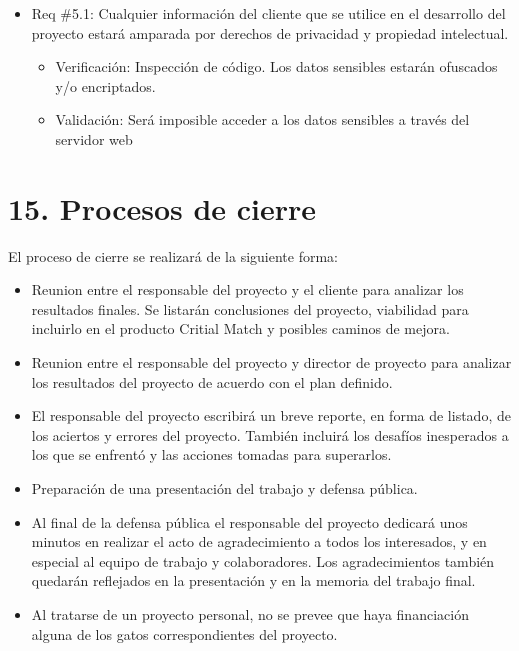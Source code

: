 \documentclass[
11pt, %
]{Clases/charter}
\begin{document}
\begin{itemize}
	\item Req \#5.1: Cualquier información del cliente que se utilice en el desarrollo del proyecto estará amparada por derechos de privacidad y propiedad intelectual.
	      \begin{itemize}
		      \item Verificación: Inspección de código. Los datos sensibles estarán ofuscados y/o encriptados.
		      \item Validación: Será imposible acceder a los datos sensibles a través del servidor web
	      \end{itemize}

\end{itemize}

\pagebreak

\section{15. Procesos de cierre}
\label{sec:cierre}
El proceso de cierre se realizará de la siguiente forma:

\begin{itemize}
	\item Reunion entre el responsable del proyecto y el cliente para analizar los resultados finales.
	      Se listarán conclusiones del proyecto, viabilidad para incluirlo en el producto Critial Match y posibles caminos de mejora.
	\item Reunion entre el responsable del proyecto y director de proyecto para analizar los resultados del proyecto de acuerdo con el plan definido.
	\item El responsable del proyecto escribirá un breve reporte, en forma de listado, de los aciertos y errores del proyecto.
	      También incluirá los desafíos inesperados a los que se enfrentó y las acciones tomadas para superarlos.
	\item Preparación de una presentación del trabajo y defensa pública.
	\item Al final de la defensa pública el responsable del proyecto dedicará unos minutos en realizar el acto de agradecimiento a todos los interesados, y en especial al equipo de trabajo y colaboradores.
	      Los agradecimientos también quedarán reflejados en la presentación y en la memoria del trabajo final.
	\item Al tratarse de un proyecto personal, no se prevee que haya financiación alguna de los gatos correspondientes del proyecto.
\end{itemize}
\end{document}
